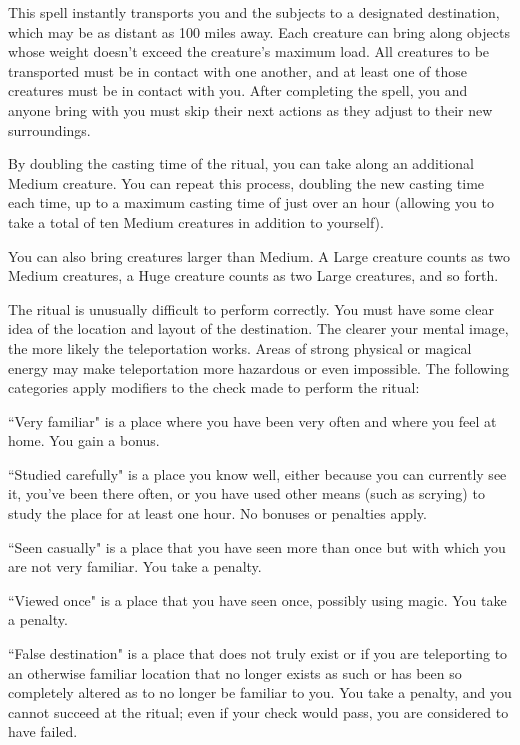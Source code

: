 \begin{spelleffect}
This spell instantly transports you and the subjects to a designated destination, which may be as distant as 100 miles away. Each creature can bring along objects whose weight doesn't exceed the creature's maximum load. All creatures to be transported must be in contact with one another, and at least one of those creatures must be in contact with you. After completing the spell, you and anyone bring with you must skip their next actions as they adjust to their new surroundings.
\par By doubling the casting time of the ritual, you can take along an additional Medium creature. You can repeat this process, doubling the new casting time each time, up to a maximum casting time of just over an hour (allowing you to take a total of ten Medium creatures in addition to yourself).
\par You can also bring creatures larger than Medium. A Large creature counts as two Medium creatures, a Huge creature counts as two Large creatures, and so forth.
\par The  ritual is unusually difficult to perform correctly. You must have some clear idea of the location and layout of the destination. The clearer your mental image, the more likely the teleportation works. Areas of strong physical or magical energy may make teleportation more hazardous or even impossible. The following categories apply modifiers to the check made to perform the ritual:
\begin{itemize*}
\item ``Very familiar" is a place where you have been very often and where you feel at home. You gain a  bonus.
\item ``Studied carefully" is a place you know well, either because you can currently see it, you've been there often, or you have used other means (such as scrying) to study the place for at least one hour. No bonuses or penalties apply.
\item ``Seen casually" is a place that you have seen more than once but with which you are not very familiar. You take a  penalty.
\item ``Viewed once" is a place that you have seen once, possibly using magic. You take a  penalty.
\item ``False destination" is a place that does not truly exist or if you are teleporting to an otherwise familiar location that no longer exists as such or has been so completely altered as to no longer be familiar to you. You take a  penalty, and you cannot succeed at the ritual; even if your check would pass, you are considered to have failed.
\end{itemize*}


\end{spelleffect}
